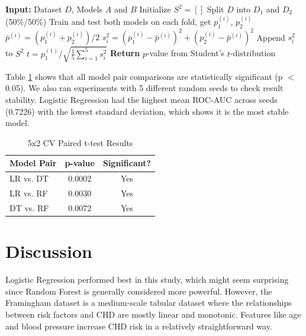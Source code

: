 \documentclass[conference]{IEEEtran}
\begin{document}
\begin{algorithm}[htbp]
\caption{$5\times2$ Cross-Validation Paired $t$-test}
\begin{algorithmic}[1]
\STATE \textbf{Input:} Dataset $D$, Models $A$ and $B$
\STATE Initialize $S^2 = []$
    \STATE Split $D$ into $D_1$ and $D_2$ (50\%/50\%)
    \STATE Train and test both models on each fold, get $p^{(i)}_1$, $p^{(i)}_2$
    \STATE $\bar{p}^{(i)} = (p^{(i)}_1 + p^{(i)}_2)/2$
    \STATE $s^2_i = (p^{(i)}_1 - \bar{p}^{(i)})^2 + (p^{(i)}_2 - \bar{p}^{(i)})^2$
    \STATE Append $s^2_i$ to $S^2$
\ENDFOR
\STATE $t = p^{(1)}_1 / \sqrt{\frac{1}{5}\sum_{i=1}^5 s^2_i}$
\STATE \textbf{Return} $p$-value from Student's $t$-distribution
\end{algorithmic}
\end{algorithm}

Table \ref{tab:cv} shows that all model pair comparisons are statistically significant (p $<$ 0.05). We also ran experiments with 5 different random seeds to check result stability. Logistic Regression had the highest mean ROC-AUC across seeds (0.7226) with the lowest standard deviation, which shows it is the most stable model.

\begin{table}[htbp]
\caption{5x2 CV Paired t-test Results}
\begin{center}
\begin{tabular}{lcc}
\toprule
\textbf{Model Pair} & \textbf{p-value} & \textbf{Significant?} \\
\midrule
LR vs. DT & 0.0002 & Yes \\
LR vs. RF & 0.0030 & Yes \\
DT vs. RF & 0.0072 & Yes \\
\bottomrule
\end{tabular}
\label{tab:cv}
\end{center}
\end{table}

\section{Discussion}

Logistic Regression performed best in this study, which might seem surprising since Random Forest is generally considered more powerful. However, the Framingham dataset is a medium-scale tabular dataset where the relationships between risk factors and CHD are mostly linear and monotonic. Features like age and blood pressure increase CHD risk in a relatively straightforward way.
\end{document}
